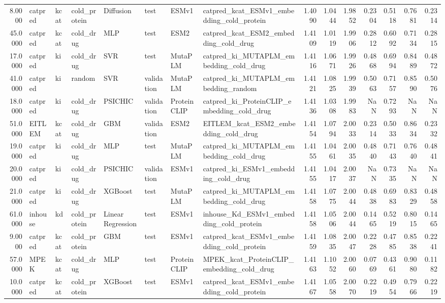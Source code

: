 \begin{tabular}{rlllllllrrrrrrr}
8.0000 & catpred & kcat & cold_protein & Diffusion & test & ESMv1 & catpred_kcat_ESMv1_embedding_cold_protein & 1.4090 & 1.0444 & 1.9852 & 0.2304 & 0.5118 & 0.7681 & 0.2314 \\
45.0000 & catpred & kcat & cold_drug & MLP & test & ESM2 & catpred_kcat_ESM2_embedding_cold_drug & 1.4109 & 1.0119 & 1.9906 & 0.2812 & 0.6092 & 0.7134 & 0.2815 \\
17.0000 & catpred & ki & cold_drug & SVR & test & MutaPLM & catpred_ki_MUTAPLM_embedding_cold_drug & 1.4116 & 1.0671 & 1.9926 & 0.4868 & 0.6994 & 0.8489 & 0.4872 \\
41.0000 & catpred & ki & random & SVR & validation & MutaPLM & catpred_ki_MUTAPLM_embedding_random & 1.4121 & 1.0825 & 1.9939 & 0.5063 & 0.7157 & 0.8590 & 0.5076 \\
18.0000 & catpred & ki & cold_drug & PSICHIC & validation & ProteinCLIP & catpred_ki_ProteinCLIP_embedding_cold_drug & 1.4136 & 1.0308 & 1.9983 & NaN & 0.7293 & NaN & NaN \\
51.0000 & EITLEM & kcat & cold_drug & GBM & validation & ESM2 & EITLEM_kcat_ESM2_embedding_cold_drug & 1.4154 & 1.0794 & 2.0033 & 0.2314 & 0.5033 & 0.8634 & 0.2332 \\
19.0000 & catpred & ki & cold_drug & MLP & test & MutaPLM & catpred_ki_MUTAPLM_embedding_cold_drug & 1.4155 & 1.0461 & 2.0035 & 0.4840 & 0.7143 & 0.7640 & 0.4841 \\
20.0000 & catpred & ki & cold_drug & PSICHIC & validation & ESMv1 & catpred_ki_ESMv1_embedding_cold_drug & 1.4155 & 1.0417 & 2.0037 & NaN & 0.7335 & NaN & NaN \\
21.0000 & catpred & ki & cold_drug & XGBoost & test & MutaPLM & catpred_ki_MUTAPLM_embedding_cold_drug & 1.4158 & 1.0775 & 2.0044 & 0.4838 & 0.6983 & 0.8329 & 0.4858 \\
61.0000 & inhouse & kd & cold_protein & Linear Regression & test & ESMv1 & inhouse_Kd_ESMv1_embedding_cold_protein & 1.4158 & 1.0506 & 2.0044 & 0.1465 & 0.5219 & 0.8015 & 0.1465 \\
9.0000 & catpred & kcat & cold_protein & GBM & test & ESMv1 & catpred_kcat_ESMv1_embedding_cold_protein & 1.4159 & 1.0835 & 2.0047 & 0.2228 & 0.4785 & 0.8538 & 0.2241 \\
57.0000 & MPEK & kcat & cold_drug & MLP & test & ProteinCLIP & MPEK_kcat_ProteinCLIP_embedding_cold_drug & 1.4163 & 1.1052 & 2.0060 & 0.0769 & 0.4361 & 0.9080 & 0.1182 \\
10.0000 & catpred & kcat & cold_protein & XGBoost & test & ESMv1 & catpred_kcat_ESMv1_embedding_cold_protein & 1.4167 & 1.0558 & 2.0070 & 0.2219 & 0.4954 & 0.7966 & 0.2219 \\

\end{tabular}
